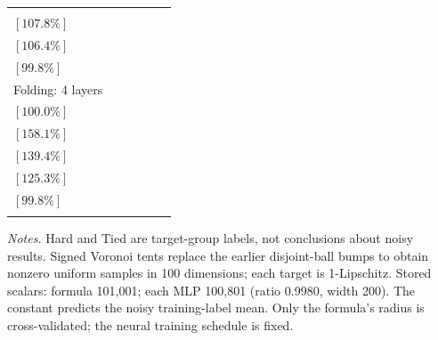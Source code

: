 \documentclass[10pt]{article}
\begin{document}
\begin{table}[t]
\begin{subtable}{\textwidth}
{\begin{tabular}{@{}lccccc@{}}
  \shortstack{$(1.295\pm 0.072)\times10^{-1}$\\$[107.8\%]$} &
  \shortstack{$(1.278\pm 0.055)\times10^{-1}$\\$[106.4\%]$} &
  \shortstack{$(1.200\pm 0.036)\times10^{-1}$\\$[99.8\%]$} \\
\addlinespace[3pt]
Folding: 4 layers &
  \shortstack{$(4.229\pm 0.278)\times10^{-2}$\\$[100.0\%]$} &
  \shortstack{$(6.687\pm 0.439)\times10^{-2}$\\$[158.1\%]$} &
  \shortstack{$(5.894\pm 0.230)\times10^{-2}$\\$[139.4\%]$} &
  \shortstack{$(5.301\pm 0.362)\times10^{-2}$\\$[125.3\%]$} &
  \shortstack{$(4.221\pm 0.265)\times10^{-2}$\\$[99.8\%]$} \\
\addlinespace[3pt]
\bottomrule
\end{tabular}%
}
\end{subtable}
\par\smallskip
\begin{minipage}{\textwidth}
\footnotesize
\emph{Notes.} Hard and Tied are target-group labels, not conclusions about noisy results. Signed Voronoi tents replace the earlier disjoint-ball bumps to obtain nonzero uniform samples in 100 dimensions; each target is 1-Lipschitz. Stored scalars: formula 101,001; each MLP 100,801 (ratio 0.9980, width 200). The constant predicts the noisy training-label mean. Only the formula's radius is cross-validated; the neural training schedule is fixed.
\end{minipage}
\end{table}
\end{document}
